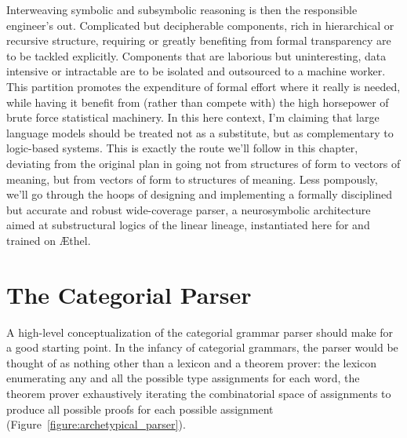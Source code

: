 Interweaving symbolic and subsymbolic reasoning is then the responsible engineer's out.
Complicated but decipherable components, rich in hierarchical or recursive structure, requiring or greatly benefiting from formal transparency are to be tackled explicitly.
Components that are laborious but uninteresting, data intensive or intractable are to be isolated and outsourced to a machine worker.
This partition promotes the expenditure of formal effort where it really is needed, while having it benefit from (rather than compete with) the high horsepower of brute force statistical machinery.
In this here context, I'm claiming that large language models should be treated not as a substitute, but as complementary to logic-based systems.
This is exactly the route we'll follow in this chapter, deviating from the original plan in going not from structures of form to vectors of meaning, but from vectors of form to structures of meaning.
Less pompously, we'll go through the hoops of designing and implementing a formally disciplined but accurate and robust wide-coverage parser, a neurosymbolic architecture aimed at substructural logics of the linear lineage, instantiated here for \NLPplus{} and trained on \AE thel.


\section{The Categorial Parser}
\label{section:parse}
A high-level conceptualization of the categorial grammar parser should make for a good starting point.
In the infancy of categorial grammars, the parser would be thought of as nothing other than a lexicon and a theorem prover: the lexicon enumerating any and all the possible type assignments for each word, the theorem prover exhaustively iterating the combinatorial space of assignments to produce all possible proofs for each possible assignment (Figure~\ref{figure:archetypical_parser}).

